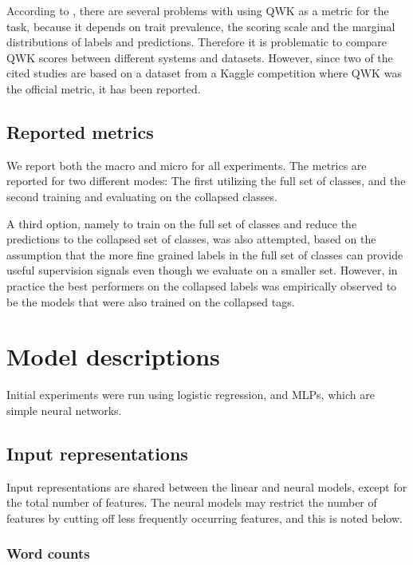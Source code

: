 According to \textcite{yannakoudakis2015evaluating}, there are several
problems with using \ac{QWK} as a metric for the task, because it depends on
trait prevalence, the scoring scale and the marginal distributions of labels
and predictions. Therefore it is problematic to compare \ac{QWK} scores
between different systems and datasets. However, since two of the cited
studies are based on a dataset from a Kaggle competition where \ac{QWK} was
the official metric, it has been reported.


\subsection{Reported metrics}

We report both the macro and micro \FI for all experiments. The metrics are
reported for two different modes: The first utilizing the full set of
classes, and the second training and evaluating on the collapsed classes.

A third option, namely to train on the full set of classes and reduce the
predictions to the collapsed set of classes, was also attempted, based on the
assumption that the more fine grained labels in the full set of classes can
provide useful supervision signals even though we evaluate on a smaller set.
However, in practice the best performers on the collapsed labels was
empirically observed to be the models that were also trained on the collapsed
tags.


\section{Model descriptions}

Initial experiments were run using logistic regression, and \acp{MLP}, which
are simple neural networks.

\subsection{Input representations}

Input representations are shared between the linear and neural models, except
for the total number of features. The neural models may restrict the number
of features by cutting off less frequently occurring features, and this is
noted below.

\subsubsection*{Word counts}

